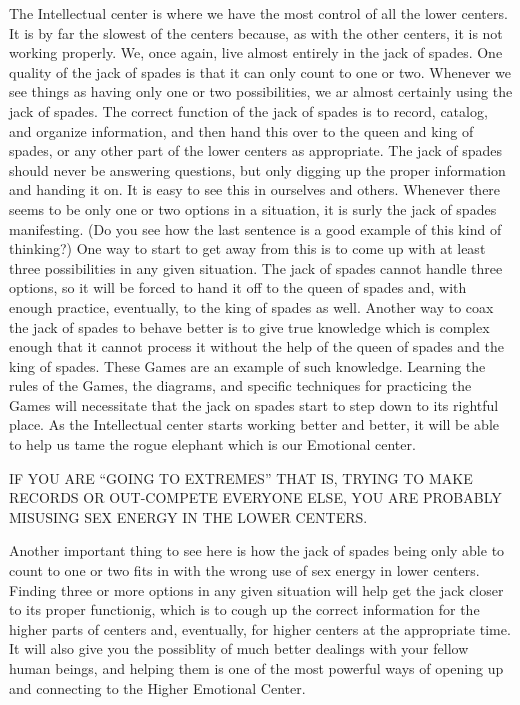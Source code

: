 \documentclass[12pt,letterpaper]{book}
\begin{document}
The Intellectual center is where we have the most control of all the lower centers. It is by far the slowest of the centers because, as with the other centers, it is not working properly. We, once again, live almost entirely in the jack of spades. One quality of the jack of spades is that it can only count to one or two. Whenever we see things as having only one or two possibilities, we ar almost certainly using the jack of spades. The correct function of the jack of spades is to record, catalog, and organize information, and then hand this over to the queen and king of spades, or any other part of the lower centers as appropriate. The jack of spades should never be answering questions, but only digging up the proper information and handing it on. It is easy to see this in ourselves and others. Whenever there seems to be only one or two options in a situation, it is surly the jack of spades manifesting. (Do you see how the last sentence is a good example of this kind of thinking?) One way to start to get away from this is to come up with at least three possibilities in any given situation. The jack of spades cannot handle three options, so it will be forced to hand it off to the queen of spades and, with enough practice, eventually, to the king of spades as well. Another way to coax the jack of spades to behave better is to give true knowledge which is complex enough that it cannot process it without the help of the queen of spades and the king of spades. These Games are an example of such knowledge. Learning the rules of the Games, the diagrams, and specific techniques for practicing the Games will necessitate that the jack on spades start to step down to its rightful place. As the Intellectual center starts working better and better, it will be able to help us tame the rogue elephant which is our Emotional center.

IF YOU ARE ``GOING TO EXTREMES'' THAT IS, TRYING TO MAKE RECORDS OR OUT-COMPETE EVERYONE ELSE, YOU ARE PROBABLY MISUSING SEX ENERGY IN THE LOWER CENTERS.

Another important thing to see here is how the jack of spades being only able to count to one or two fits in with the wrong use of sex energy in lower centers. Finding three or more options in any given situation will help get the jack closer to its proper functionig, which is to cough up the correct information for the higher parts of centers and, eventually, for higher centers at the appropriate time. It will also give you the possiblity of much better dealings with your fellow human beings, and helping them is one of the most powerful ways of opening up and connecting to the Higher Emotional Center.
\end{document}
